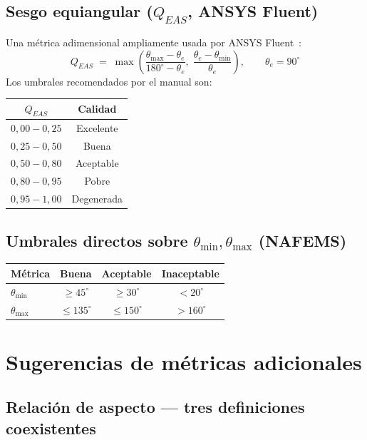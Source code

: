 \documentclass[11pt,a4paper]{article}
\begin{document}
\subsection{Sesgo equiangular ($Q_{EAS}$, ANSYS Fluent)}
Una m\'etrica adimensional ampliamente usada por ANSYS Fluent~\cite{FluentUG}:
\begin{equation}
\boxed{\;Q_{EAS} \;=\; \max\!\left(\frac{\theta_{\max}-\theta_e}{180^\circ-\theta_e},\;\frac{\theta_e-\theta_{\min}}{\theta_e}\right),\qquad \theta_e = 90^\circ\;}
\label{eq:EAS}
\end{equation}
Los umbrales recomendados por el manual son:
\begin{center}
\renewcommand{\arraystretch}{1.15}
\begin{tabular}{cc}
\toprule
$Q_{EAS}$ & Calidad \\
\midrule
$0{,}00 - 0{,}25$ & Excelente \\
$0{,}25 - 0{,}50$ & Buena \\
$0{,}50 - 0{,}80$ & Aceptable \\
$0{,}80 - 0{,}95$ & Pobre \\
$0{,}95 - 1{,}00$ & Degenerada \\
\bottomrule
\end{tabular}
\end{center}

\subsection{Umbrales directos sobre $\theta_{\min},\theta_{\max}$ (NAFEMS)}
\begin{center}
\renewcommand{\arraystretch}{1.15}
\begin{tabular}{lccc}
\toprule
\textbf{M\'etrica} & \textbf{Buena} & \textbf{Aceptable} & \textbf{Inaceptable} \\
\midrule
$\theta_{\min}$ & $\ge 45^\circ$ & $\ge 30^\circ$ & $<20^\circ$ \\
$\theta_{\max}$ & $\le 135^\circ$ & $\le 150^\circ$ & $>160^\circ$ \\
\bottomrule
\end{tabular}
\end{center}

\section{Sugerencias de m\'etricas adicionales}
\label{sec:extras}

\subsection{Relaci\'on de aspecto --- tres definiciones coexistentes}
\end{document}
